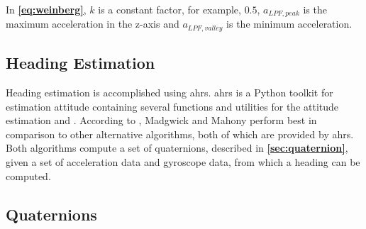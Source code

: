 In \textbf{\autoref{eq:weinberg}}, $k$ is a constant factor, for example, $0.5$, $a_{LPF, peak}$ is the maximum acceleration in the z-axis and $a_{LPF, valley}$ is the minimum acceleration. 

\subsection{Heading Estimation}
Heading estimation is accomplished using \gls{ahrs}. \gls{ahrs} is a Python toolkit for estimation attitude containing several functions and utilities for the attitude estimation\cite{ahrs} and \cite{FastAHRS}. According to \cite{MultisensorComparison}, Madgwick and Mahony perform best in comparison to other alternative algorithms, both of which are provided by \gls{ahrs}. Both algorithms compute a set of quaternions, described in \textbf{\autoref{sec:quaternion}}, given a set of acceleration data and gyroscope data, from which a heading can be computed.

\subsection{Quaternions} \label{sec:quaternion}